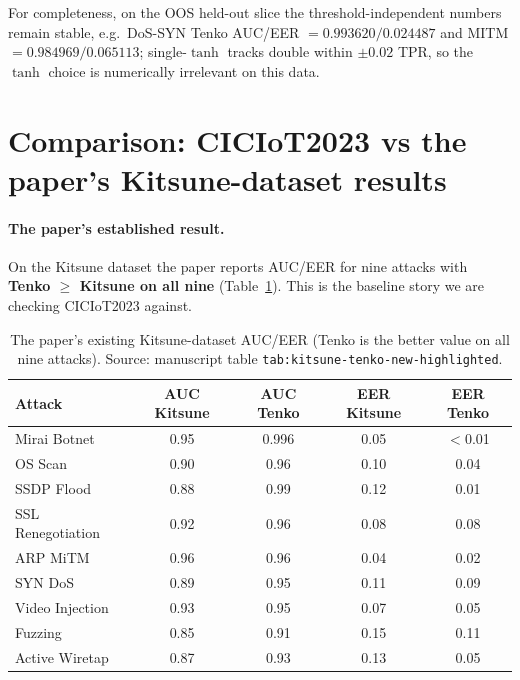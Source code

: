 \documentclass[11pt]{article}
\newcommand{\lt}{\ensuremath{<}}
\begin{document}
For completeness, on the OOS held-out slice the threshold-independent numbers remain stable, e.g.\
DoS-SYN Tenko AUC/EER $= 0.993620 / 0.024487$ and MITM $= 0.984969 / 0.065113$; single-$\tanh$ tracks
double within $\pm 0.02$ TPR, so the $\tanh$ choice is numerically irrelevant on this data.

\section{Comparison: CICIoT2023 vs the paper's Kitsune-dataset results}
\label{sec:compare}

\paragraph{The paper's established result.} On the Kitsune dataset the paper reports AUC/EER for nine
attacks with \textbf{Tenko $\ge$ Kitsune on all nine} (Table~\ref{tab:paper-auc}). This is the
baseline story we are checking CICIoT2023 against.

\begin{table}[t]
\centering
\caption{The paper's existing Kitsune-dataset AUC/EER (Tenko is the better value on all nine
attacks). Source: manuscript table \texttt{tab:kitsune-tenko-new-highlighted}.}
\label{tab:paper-auc}
\begin{tabular}{lcccc}
\toprule
\textbf{Attack} & \textbf{AUC Kitsune} & \textbf{AUC Tenko} & \textbf{EER Kitsune} & \textbf{EER Tenko} \\
\midrule
Mirai Botnet      & 0.95 & 0.996 & 0.05 & \lt 0.01 \\
OS Scan           & 0.90 & 0.96  & 0.10 & 0.04 \\
SSDP Flood        & 0.88 & 0.99  & 0.12 & 0.01 \\
SSL Renegotiation & 0.92 & 0.96  & 0.08 & 0.08 \\
ARP MiTM          & 0.96 & 0.96  & 0.04 & 0.02 \\
SYN DoS           & 0.89 & 0.95  & 0.11 & 0.09 \\
Video Injection   & 0.93 & 0.95  & 0.07 & 0.05 \\
Fuzzing           & 0.85 & 0.91  & 0.15 & 0.11 \\
Active Wiretap    & 0.87 & 0.93  & 0.13 & 0.05 \\
\bottomrule
\end{tabular}
\end{table}
\end{document}
